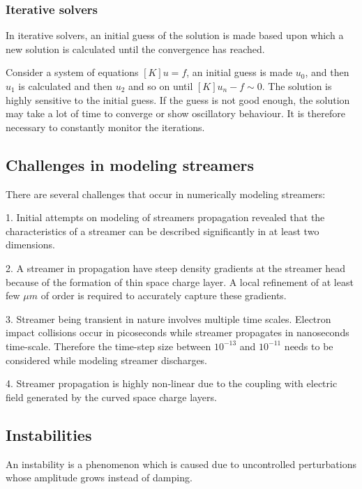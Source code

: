 \documentclass[paper=a4, fontsize=13pt]{scrartcl}
\begin{document}
\subsubsection{Iterative solvers}

In iterative solvers, an initial guess of the solution is made based upon which a new solution is calculated until the convergence has reached.

Consider a system of equations $[K] u = f$, an initial guess is made $u_0$, and then $u_1$ is calculated and then $u_2$ and so on until $[K]u_n-f \sim 0$. The solution is highly sensitive to the initial guess. If the guess is not good enough, the solution may take a lot of time to converge or show oscillatory behaviour. It is therefore necessary to constantly monitor the iterations.

\subsection{Challenges in modeling streamers}

   There are several challenges that occur in numerically modeling streamers: 
   
   1. Initial attempts on modeling of streamers propagation revealed that the characteristics of a streamer can be described significantly in at least two dimensions. 
   
   2. A streamer in propagation have steep density gradients at the streamer head because of the formation of thin space charge layer. A local refinement of at least few $\mu m$ of order is required to accurately capture these gradients.
   
   3. Streamer being transient in nature involves multiple time scales. Electron impact collisions occur in picoseconds while streamer propagates in nanoseconds time-scale. Therefore the time-step size between $10^{-13}$ and $10^{-11}$ needs to be considered while modeling streamer discharges.
   
   4. Streamer propagation is highly non-linear due to the coupling with electric field generated by the curved space charge layers. 
   

\subsection{Instabilities}

An instability is a phenomenon which is caused due to uncontrolled perturbations whose amplitude grows instead of damping.  
\end{document}
